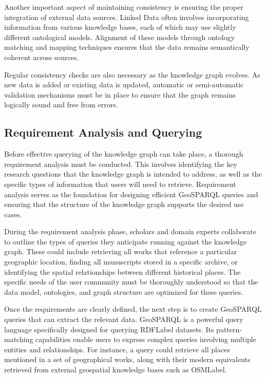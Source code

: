 Another important aspect of maintaining consistency is ensuring the proper integration of external data sources. Linked Data often involves incorporating information from various knowledge bases, each of which may use slightly different ontological models. Alignment of these models through ontology matching and mapping techniques ensures that the data remains semantically coherent across sources.

Regular consistency checks are also necessary as the knowledge graph evolves. As new data is added or existing data is updated, automatic or semi-automatic validation mechanisms must be in place to ensure that the graph remains logically sound and free from errors.

\subsection{Requirement Analysis and Querying}\label{VII-subsec:imago-querying}

Before effective querying of the knowledge graph can take place, a thorough requirement analysis must be conducted. This involves identifying the key research questions that the knowledge graph is intended to address, as well as the specific types of information that users will need to retrieve. Requirement analysis serves as the foundation for designing efficient GeoSPARQL queries and ensuring that the structure of the knowledge graph supports the desired use cases.

During the requirement analysis phase, scholars and domain experts collaborate to outline the types of queries they anticipate running against the knowledge graph. These could include retrieving all works that reference a particular geographic location, finding all manuscripts stored in a specific archive, or identifying the spatial relationships between different historical places. The specific needs of the user community must be thoroughly understood so that the data model, ontologies, and graph structure are optimized for these queries.

Once the requirements are clearly defined, the next step is to create GeoSPARQL queries that can extract the relevant data. GeoSPARQL is a powerful query language specifically designed for querying \acrshort{RDFLabel} datasets. Its pattern-matching capabilities enable users to express complex queries involving multiple entities and relationships. For instance, a query could retrieve all places mentioned in a set of geographical works, along with their modern equivalents retrieved from external geospatial knowledge bases such as \acrshort{OSMLabel}.

